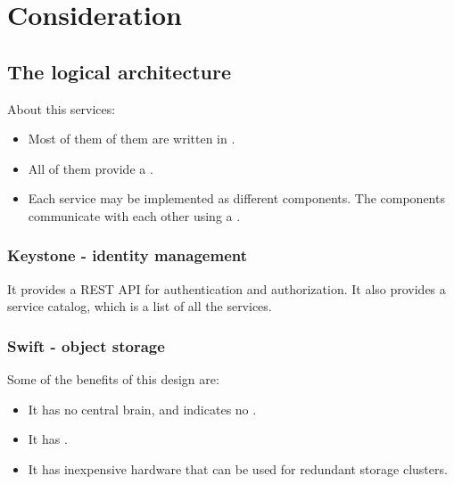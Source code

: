 
\section{Consideration}

\subsection{The logical architecture}


About this services:

\begin{itemize}
\item Most of them of them are written in .
\item All of them provide a .
\item Each service may be implemented as different components. The components
  communicate with each other using a .
\end{itemize}

\subsubsection{Keystone - identity management}


It provides a REST API for authentication and authorization. It also provides a
service catalog, which is a list of all the services.



\subsubsection{Swift - object storage}



Some of the benefits of this design are:

\begin{itemize}
\item It has no central brain, and indicates no .
\item It has .
\item It has inexpensive hardware that can be used for redundant storage clusters.
\end{itemize}


